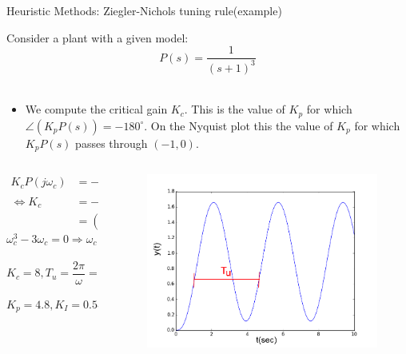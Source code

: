 \begin{frame}{Heuristic Methods: Ziegler-Nichols tuning rule(example)}
	\vspace{-1em}
	\footnotesize{
	\begin{example}
		Consider a plant with a given model:\\
		\vspace{-0.5em}
			$$ P(s) = \frac{1}{(s+1)^3} $$\\
			\vspace{-0.7em}
			\begin{itemize}
				\item We compute the critical gain $K_c$. This is the value of $K_p$ for which $\angle (K_p P(s)) = - 180^\circ$. On the Nyquist plot this the value of $K_p$ for which $K_p P(s)$ passes through $(-1,0)$.\\
			\end{itemize}
				\vspace{-1.5em}
				\begin{columns}
					\begin{column}{0.5 \textwidth}
							\begin{align*}
							K_cP(j\omega_c) &= -1 \\ \Leftrightarrow K_c &= 	-(j\omega_c + 1)^3 \\
								& = (3\omega_c^2-1)+j(\omega_c^3 - 3\omega_c)
							\end{align*}
								\vspace{-1.5em}
								$$ \omega_c^3-3\omega_c = 0 \Rightarrow \omega_c = \sqrt{3}$$\\
								\vspace{-1.5em}
								$$K_c = 8, T_u = \frac{2\pi}{\omega} = 3.628$$\\
								\vspace{-1.5em}
								$$K_p = 4.8, K_I = 0.551  K_p, K_d =  0.45 K_p$$
						
					\end{column}
					\begin{column}{0.4 \textwidth}
\begin{figure}
\centering
\includegraphics[width=1\linewidth]{img/Z_N_PID_example}
\end{figure}


\end{column}
\end{columns}
\end{example}}
\end{frame}
